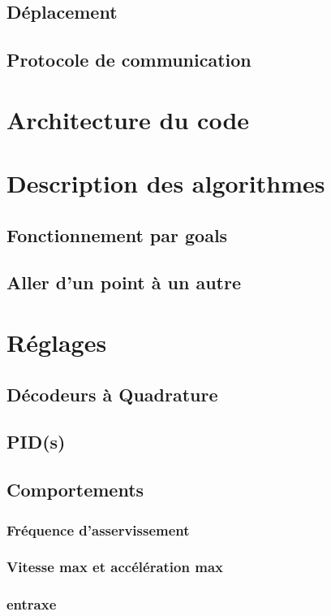 \documentclass{article}
\begin{document}
			\subsection{Déplacement}
			\subsection{Protocole de communication}

		\section{Architecture du code}

		\section{Description des algorithmes}
			\subsection{Fonctionnement par goals}
			\subsection{Aller d'un point à un autre}

		\section{Réglages}
			
			\subsection{Décodeurs à Quadrature}
			\subsection{PID(s)}
			\subsection{Comportements}
				\subsubsection{Fréquence d'asservissement}
				\subsubsection{Vitesse max et accélération max}
				\subsubsection{entraxe}
\end{document}
